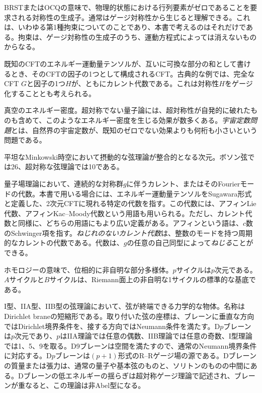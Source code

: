 {BRSTまたはOCQの意味で、物理的状態における行列要素がゼロであることを要求される対称性の生成子。通常はゲージ対称性から生じると理解できる。これは、いわゆる第1種拘束についてのことであり、本書で考えるのはそれだけである。拘束は、ゲージ対称性の生成子のうち、運動方程式によっては消えないものからなる。}

{既知のCFTのエネルギー運動量テンソルが、互いに可換な部分の和として書けるとき、そのCFTの因子の1つとして構成されるCFT。古典的な例では、完全なCFT $G$と因子の1つ$H$が、ともにカレント代数である。これは対称性$H$をゲージ化することとも考えられる。}

{真空のエネルギー密度。超対称でない量子論には、超対称性が自発的に破れたものも含めて、このようなエネルギー密度を生じる効果が数多くある。\emph{宇宙定数問題}とは、自然界の宇宙定数が、既知のゼロでない効果よりも何桁も小さいという問題である。}

{平坦なMinkowski時空において摂動的な弦理論が整合的となる次元。ボソン弦では26、超対称な弦理論では10である。}

{量子場理論において、連続的な対称群$g$に伴うカレント、またはそのFourierモードの代数。本書で用いる場合には、エネルギー運動量テンソルをSugawara形式と定義した、2次元CFTに現れる特定の代数を指す。この代数には、アフィンLie代数、アフィンKac--Moody代数という用語も用いられる。ただし、カレント代数と同様に、どちらの用語にもより広い定義がある。アフィンという語は、$c$数のSchwinger項を指す。\emph{ねじれのないカレント代数}は、整数のモードを持つ周期的なカレントの代数である。代数は、$g$の任意の自己同型によって\emph{ねじる}ことができる。}

{ホモロジーの意味で、位相的に非自明な部分多様体。$p$サイクルは$p$次元である。$A$サイクルと$B$サイクルは、Riemann面上の非自明な1サイクルの標準的な基底である。}

{I型、IIA型、IIB型の弦理論において、弦が終端できる力学的な物体。名称はDirichlet braneの短縮形である。取り付いた弦の座標は、ブレーンに垂直な方向ではDirichlet境界条件を、接する方向ではNeumann条件を満たす。D$p$ブレーンは$p$次元であり、$p$はIIA理論では任意の偶数、IIB理論では任意の奇数、I型理論では1、5、9を取る。D9ブレーンは空間を満たすので、通常のNeumann境界条件に対応する。D$p$ブレーンは$(p+1)$形式のR--Rゲージ場の源である。Dブレーンの質量または張力は、通常の量子や基本弦のものと、ソリトンのものの中間にある。Dブレーンの低エネルギーの揺らぎは超対称ゲージ理論で記述され、ブレーンが重なると、この理論は非Abel型になる。}

